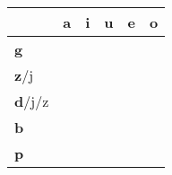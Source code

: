 






\bigskip
\begin{center}
\Huge

\begin{tabular}{m{2.5cm}||m{1cm}|m{1cm}|m{1cm}|m{1cm}|m{1cm}|}
          &\textbf{a}& \textbf{i}& \textbf{u}& \textbf{e}& \textbf{o}\\ \hline \hline
\textbf{g}&&&&&\\\hline
\textbf{z}/j&&&&&\\\hline
\textbf{d}/j/z&&&&&\\\hline
\textbf{b}&&&&&\\\hline
\textbf{p}&&&&&\\\hline
\end{tabular}
\end{center}
